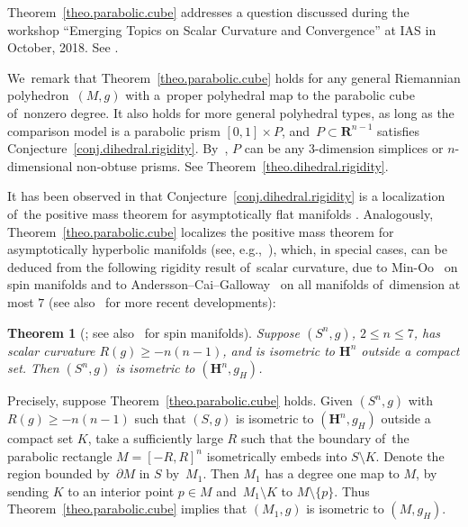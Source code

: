 \documentclass[pdftex]{sigma}
\numberwithin{equation}{section}
\newtheorem{theo}[prop]{Theorem}
\theoremstyle{definition}
\newcommand{\HH}{\mathbf{H}}
\newcommand{\RR}{\mathbf{R}}
\begin{document}
Theorem~\ref{theo.parabolic.cube} addresses a question discussed during the workshop ``Emerging Topics on Scalar Curvature and Convergence'' at IAS in October, 2018. See \cite[Section~6]{gromov2018IAS}.

We~remark that Theorem~\ref{theo.parabolic.cube} holds for any general Riemannian polyhedron~$(M,g)$ with a~proper polyhedral map to the parabolic cube of~nonzero degree. It also holds for more general polyhedral types, as long as the comparison model is a parabolic prism $[0,1]\times P$, and~$P\subset \RR^{n-1}$ satisfies Conjecture~\ref{conj.dihedral.rigidity}. By~\cite{Li2017polyhedron,li2019dihedral}, $P$ can be any $3$-dimension simplices or $n$-dimensional non-obtuse prisms. See Theorem~\ref{theo.dihedral.rigidity}.

It has been observed in \cite[Section~5]{li2019dihedral} that Conjecture~\ref{conj.dihedral.rigidity} is a localization of~the positive mass theorem for asymptotically flat manifolds \cite{SchoenYau1979ProofPositiveMass,Witten1981newproof}. Analogously, Theorem~\ref{theo.parabolic.cube} localizes the positive mass theorem for asymptotically hyperbolic manifolds (see, e.g.,~\cite{chruscielHerzlich2003mass,ChruscielNagy2001mass,Wang2001mass}), which, in special cases, can be deduced from the following rigidity result of~scalar curvature, due to Min-Oo~\cite{Minoo1989rigidity} on spin manifolds and to Andersson--Cai--Galloway~\cite{AnderssonCaiGalloway2008rigidity} on all manifolds of~dimension at most $7$ (see also~\cite{chruciel2019hyperbolic,HuangJangMartin2020mass} for more recent developments):
\begin{theo}[\cite{AnderssonCaiGalloway2008rigidity}; see also~\cite{Minoo1989rigidity} for spin manifolds]\label{theo.R.rigidity.hyperbolic}
Suppose $(S^n,g)$, $2\le n\le 7$, has scalar curvature $R(g)\ge -n(n-1)$, and is isometric to $\HH^n$ outside a compact set. Then $(S^n,g)$ is isometric to $(\HH^n, g_H)$.
\end{theo}

Precisely, suppose Theorem~\ref{theo.parabolic.cube} holds. Given $(S^n,g)$ with $R(g)\ge -n(n-1)$ such that $(S,g)$ is isometric to $(\HH^n,g_H)$ outside a compact set $K$, take a sufficiently large $R$ such that the boundary of~the parabolic rectangle $M=[-R,R]^n$ isometrically embeds into $S\setminus K$. Denote the region bounded by~$\partial M$ in $S$ by~$M_1$. Then $M_1$ has a degree one map to $M$, by sending $K$ to an interior point $p\in M$ and~$M_1\setminus K$ to $M\setminus \{p\}$. Thus Theorem~\ref{theo.parabolic.cube} implies that $(M_1,g)$ is isometric to $(M,g_H)$.
\end{document}
